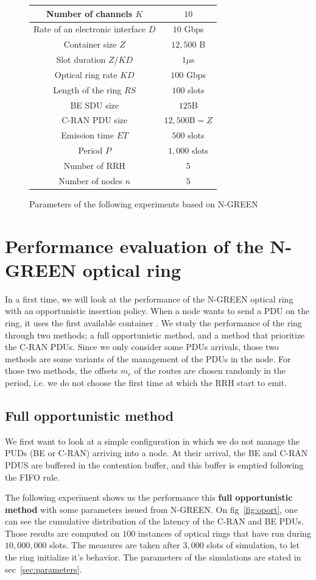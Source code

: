 \documentclass[]{algotel}
\begin{document}
  \begin{figure}
  \centering
  \begin{tabular}{|c|c|}
  \hline
 Number of channels $K$ & $10$  \tabularnewline
  \hline
  Rate of an electronic interface $D$ & $10$ Gbps \tabularnewline
  \hline
  Container size  $Z$ & $12,500$ B  \tabularnewline
  \hline
  Slot duration $Z/KD$ & $1\mu$s \tabularnewline
  \hline
  Optical ring rate $KD$ & $100$ Gbps \tabularnewline
  \hline
  Length of the ring $RS$ & $100$ slots \tabularnewline
  \hline
  BE SDU size & $125$B \tabularnewline
  \hline
  C-RAN PDU size & $12,500$B$=Z$ \tabularnewline
  \hline
  Emission time $ET$ & $500$ slots \tabularnewline
  \hline
   Period $P$ & $1,000$ slots \tabularnewline
  \hline
  Number of RRH & $5$  \tabularnewline
  \hline
  Number of nodes $n$ & $5$  \tabularnewline
  \hline
  
  \end{tabular}
  \caption{Parameters of the following experiments based on N-GREEN}\label{parameters}
  \end{figure}
  
   \section{Performance evaluation of the N-GREEN optical ring}
   \label{sec:oportmethods}
   In a first time, we will look at the performance of the N-GREEN optical ring with an opportunistic insertion policy. When a node wants to send a PDU on the ring, it uses the first available container .
    We study the performance of the ring through two methods; a full opportunistic method, and a method that prioritize the C-RAN PDUs. Since we only consider some PDUs arrivals, those two methods are some variants of the management of the PDUs in the node.
   For those two methods, the offsets $m_r$ of the routes are chosen randomly in the period, i.e. we do not choose the first time at which the RRH start to emit.

    
    \subsection{Full opportunistic method}
    \label{sec:fullopport}
    We first want to look at a simple configuration in which we do not manage the PUDs (BE or C-RAN) arriving into a node. At their arrival, the BE and C-RAN PDUS are buffered in the contention buffer, and this buffer is emptied following the FIFO rule.

The following experiment shows us the performance this {\bf full opportunistic method} with some parameters issued from N-GREEN. 
On fig~\ref{fig:oport}, one can see the cumulative distribution of the latency of the C-RAN and BE PDUs. Those results are computed on $100$ instances of optical rings that have run during $10,000,000$ slots. The measures are taken after $3,000$ slots of simulation, to let the ring initialize it's behavior. The parameters of the simulations are stated in sec~\ref{sec:parameters}.
\end{document}
